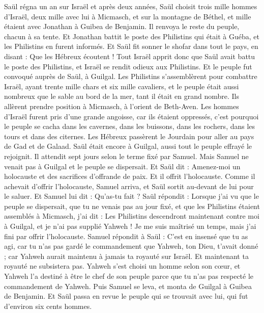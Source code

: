 \begin{multicols}{2}
\VerseOne{}Saül régna un an sur Israël et après deux années,
Saül choisit trois mille hommes d'Israël, deux mille avec lui à Micmasch, et sur la montagne de Béthel, et mille étaient avec Jonathan à Guibea de Benjamin. Il renvoya le reste du peuple, chacun à sa tente.
Et Jonathan battit le poste des Philistins qui était à Guéba, et les Philistins en furent informés. Et Saül fit sonner le shofar dans tout le pays, en disant : Que les Hébreux écoutent !
Tout Israël apprit donc que Saül avait battu le poste des Philistins, et Israël se rendit odieux aux Philistins. Et le peuple fut convoqué auprès de Saül, à Guilgal.
Les Philistins s'assemblèrent pour combattre Israël, ayant trente mille chars et six mille cavaliers, et le peuple était aussi nombreux que le sable au bord de la mer, tant il était en grand nombre. Ils allèrent prendre position à Micmasch, à l'orient de Beth-Aven.
Les hommes d'Israël furent pris d'une grande angoisse, car ils étaient oppressés, c'est pourquoi le peuple se cacha dans les cavernes, dans les buissons, dans les rochers, dans les tours et dans des citernes.
Les Hébreux passèrent le Jourdain pour aller au pays de Gad et de Galaad. Saül était encore à Guilgal, aussi tout le peuple effrayé le rejoignit.
Il attendit sept jours selon le terme fixé par Samuel. Mais Samuel ne venait pas à Guilgal et le peuple se dispersait.
Et Saül dit : Amenez-moi un holocauste et des sacrifices d'offrande de paix. Et il offrit l'holocauste.
Comme il achevait d'offrir l'holocauste, Samuel arriva, et Saül sortit au-devant de lui pour le saluer.
Et Samuel lui dit : Qu'as-tu fait ? Saül répondit : Lorsque j'ai vu que le peuple se dispersait, que tu ne venais pas au jour fixé, et que les Philistins étaient assemblés à Micmasch,
j'ai dit : Les Philistins descendront maintenant contre moi à Guilgal, et je n'ai pas supplié Yahweh ! Je me suis maîtrisé un temps, mais j'ai fini par offrir l'holocauste.
Samuel répondit à Saül : C'est en insensé que tu as agi, car tu n'as pas gardé le commandement que Yahweh, ton Dieu, t'avait donné ; car Yahweh aurait maintenu à jamais ta royauté sur Israël.
Et maintenant ta royauté ne subsistera pas. Yahweh s'est choisi un homme selon son cœur, et Yahweh l'a destiné à être le chef de son peuple parce que tu n'as pas respecté le commandement de Yahweh.
Puis Samuel se leva, et monta de Guilgal à Guibea de Benjamin. Et Saül passa en revue le peuple qui se trouvait avec lui, qui fut d'environ six cents hommes.

\end{multicols}
